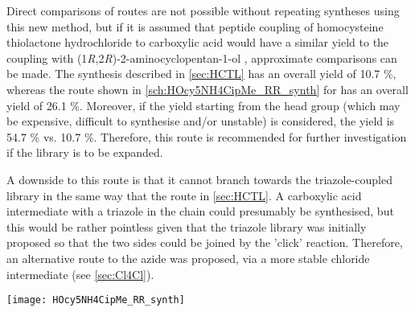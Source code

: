 Direct comparisons of routes are not possible without repeating syntheses using this new method, but if it is assumed that peptide coupling of homocysteine thiolactone hydrochloride  to carboxylic acid  would have a similar yield to the coupling with (1\textit{R},2\textit{R})-2-aminocyclopentan-1-ol , approximate comparisons can be made.
The synthesis described in \ref{sec:HCTL} has an overall yield of 10.7 \%, whereas the route shown in \ref{sch:HOcy5NH4CipMe_RR_synth} for  has an overall yield of 26.1 \%. Moreover, if the yield starting from the head group (which may be expensive, difficult to synthesise and/or unstable) is considered, the yield is 54.7 \% vs. 10.7 \%.
Therefore, this route is recommended for further investigation if the library is to be expanded.

A downside to this route is that it cannot branch towards the triazole-coupled library in the same way that the route in \ref{sec:HCTL}. A carboxylic acid intermediate with a triazole in the chain could presumably be synthesised, but this would be rather pointless given that the triazole library was initially proposed so that the two sides could be joined by the 'click' reaction.
Therefore, an alternative route to the azide was proposed, via a more stable chloride intermediate (see \ref{sec:Cl4Cl}).


\begin{scheme}[H]
	\begin{center}
		\texttt{[image: HOcy5NH4CipMe\_RR\_synth]}
		\caption{Synthesis of the cyclopentanol-CipMe conjugates   (\textit{SS}) and  (\textit{RR}) by peptide coupling. 
		\textit{SS} enantiomers are shown, but both were synthesised.
			a) NaI, TEA, acetonitrile, 100 $^{\circ}$C, 16 h, 49.9 \%. %
			b) TFA,  , r.t., 18 h, 95.6 \%. %
			c) EDC, HOBt, DIPEA, DMF, r.t., 16 h, 
			 (\textit{SS}): 54.7 \%,  %
			 (\textit{RR}): 38.7 \%. %
			\label{sch:HOcy5NH4CipMe_RR_synth}}
	\end{center}
\end{scheme}



